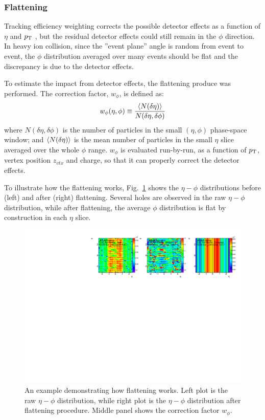 \subsubsection{Flattening}

Tracking efficiency weighting corrects the possible detector effects as a function of $\eta$ and $p_\text{T}$ , but the residual detector effects could still remain in the $\phi$ direction. In heavy ion collision, since the ”event plane” angle is random from event to event, the $\phi$ distribution averaged over many events should be flat and the discrepancy is due to the detector effects.

To estimate the impact from detector effects, the flattening produce was performed. The correction factor, $w_\phi$, is defined as:
\begin{equation}
w_\phi(\eta,\phi)\equiv\frac{\left\langle N(\delta\eta)\right\rangle}{N(\delta\eta,\delta\phi)}
\end{equation}
where $N(\delta\eta,\delta\phi)$ is the number of particles in the small $(\eta,\phi)$ phase-space window; and $\left\langle N(\delta\eta)\right\rangle$ is the mean number of particles in the small $\eta$ slice averaged over the whole $\phi$ range. $w_\phi$ is evaluated run-by-run, as a function of $p_\text{T}$, vertex position $z_{vtx}$ and charge, so that it can properly correct the detector effects.

To illustrate how the flattening works, Fig.~\ref{fig:appendix_flatten_eg} shows the $\eta-\phi$ distributions before (left) and after (right) flattening. Several holes are observed in the raw $\eta-\phi$ distribution, while after flattening, the average $\phi$ distribution is flat by construction in each $\eta$ slice.
\begin{figure}[H]
\centering
\includegraphics[width=1.\linewidth]{figs/chapter_appendix/flatten_eg.pdf}
\caption{An example demonstrating how flattening works. Left plot is the raw $\eta-\phi$ distribution, while right plot is the $\eta-\phi$ distribution after flattening procedure. Middle panel shows the correction factor $w_\phi$.}
\label{fig:appendix_flatten_eg}
\end{figure}

